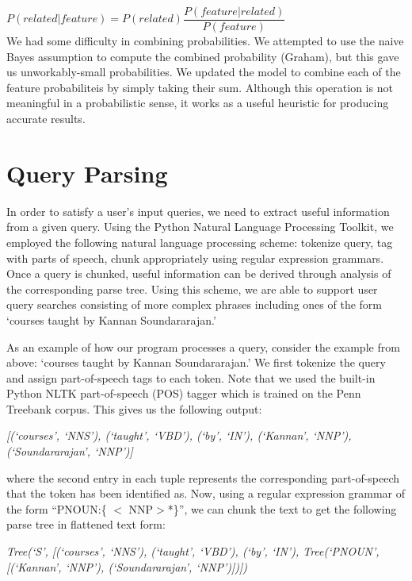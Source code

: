 \documentclass[12pt]{article}
\begin{document}
$P(related | feature) = P(related) \dfrac{P(feature | related)}{P(feature)}$ \\

We had some difficulty in combining probabilities. We attempted to use
the naive Bayes assumption to compute the combined probability (Graham), but
this gave us unworkably-small probabilities. We updated the model to
combine each of the feature probabiliteis by simply taking their
sum. Although this operation is not meaningful in a probabilistic
sense, it works as a useful heuristic for producing accurate results.

\section*{Query Parsing}
In order to satisfy a user's input queries, we need to extract useful
information from a given query. Using the Python Natural Language
Processing Toolkit, we employed the following natural language
processing scheme: tokenize query, tag with parts of speech, chunk
appropriately using regular expression grammars. Once a query is
chunked, useful information can be derived through analysis of the
corresponding parse tree. Using this scheme, we are able to support
user query searches consisting of more complex phrases including ones of the form 
`courses taught by Kannan Soundararajan.'

As an example of how our program processes a query, consider the
example from above: `courses taught by Kannan Soundararajan.' We first
tokenize the query and assign part-of-speech tags to each token. Note
that we used the built-in Python NLTK part-of-speech (POS) tagger
which is trained on the Penn Treebank corpus. This gives us the
following output: \vspace{0.15in}

\emph{\small{[(`courses', `NNS'), (`taught', `VBD'), (`by', `IN'), (`Kannan', `NNP'), (`Soundararajan', `NNP')]}}	 \vspace{0.15in}

\noindent where the second entry in each tuple represents the corresponding
part-of-speech that the token has been identified as. Now, using a
regular expression grammar of the form ``PNOUN:\{ $<$ NNP$>$*\}'', we
can chunk the text to get the following parse tree in flattened text
form: \vspace{0.15in}

\emph{\small{Tree(`S', [(`courses', `NNS'), (`taught', `VBD'), (`by', `IN'), Tree(`PNOUN', [(`Kannan', `NNP'), (`Soundararajan', `NNP')])])
}} \vspace{0.15in}
\end{document}
